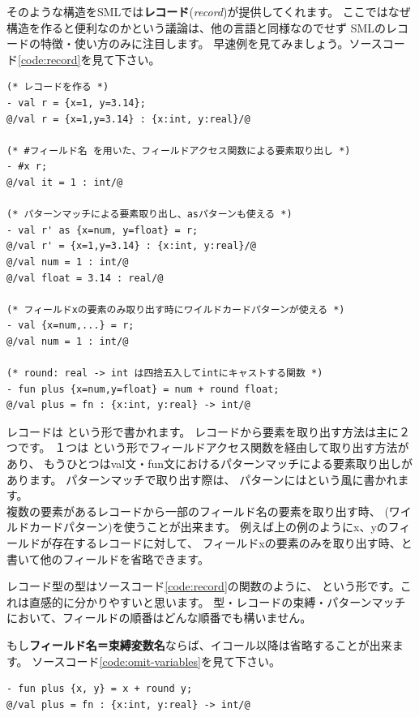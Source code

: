 \documentclass[11pt,a4paper]{jarticle}
\begin{document}
そのような構造をSMLでは\textbf{レコード}(\textit{record})が提供してくれます。
ここではなぜ構造を作ると便利なのかという議論は、他の言語と同様なのでせず
SMLのレコードの特徴・使い方のみに注目します。
早速例を見てみましょう。ソースコード\ref{code:record}を見て下さい。

\begin{lstlisting}[caption=レコードの例,label=code:record]
(* レコードを作る *)
- val r = {x=1, y=3.14};
@/val r = {x=1,y=3.14} : {x:int, y:real}/@

(* #フィールド名 を用いた、フィールドアクセス関数による要素取り出し *)
- #x r;
@/val it = 1 : int/@

(* パターンマッチによる要素取り出し、asパターンも使える *)
- val r' as {x=num, y=float} = r;
@/val r' = {x=1,y=3.14} : {x:int, y:real}/@
@/val num = 1 : int/@
@/val float = 3.14 : real/@

(* フィールドxの要素のみ取り出す時にワイルドカードパターンが使える *)
- val {x=num,...} = r;
@/val num = 1 : int/@

(* round: real -> int は四捨五入してintにキャストする関数 *)
- fun plus {x=num,y=float} = num + round float;
@/val plus = fn : {x:int, y:real} -> int/@
\end{lstlisting}

レコードは
という形で書かれます。
レコードから要素を取り出す方法は主に２つです。
１つは
という形でフィールドアクセス関数を経由して取り出す方法があり、
もうひとつはval文・fun文におけるパターンマッチによる要素取り出しがあります。
パターンマッチで取り出す際は、
パターンにはという風に書かれます。\\
複数の要素があるレコードから一部のフィールド名の要素を取り出す時、
(ワイルドカードパターン)を使うことが出来ます。
例えば上の例のようにx、yのフィールドが存在するレコードに対して、
フィールドxの要素のみを取り出す時、と書いて他のフィールドを省略できます。

レコード型の型はソースコード\ref{code:record}の関数のように、
という形です。これは直感的に分かりやすいと思います。
型・レコードの束縛・パターンマッチにおいて、フィールドの順番はどんな順番でも構いません。

もし\textbf{フィールド名＝束縛変数名}ならば、イコール以降は省略することが出来ます。
ソースコード\ref{code:omit-variables}を見て下さい。

\begin{lstlisting}[caption=レコードのパターンマッチ時の変数名の省略,label=code:omit-variables]
- fun plus {x, y} = x + round y;
@/val plus = fn : {x:int, y:real} -> int/@
\end{lstlisting}
\end{document}
